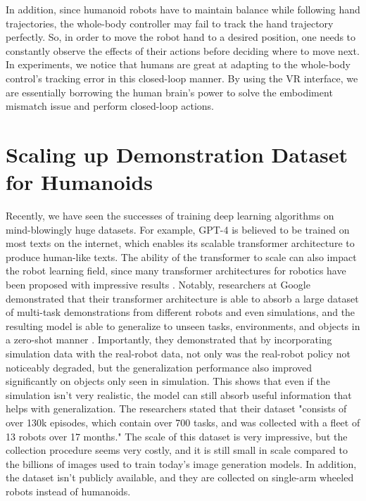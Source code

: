 In addition, since humanoid robots have to maintain balance while following hand trajectories, the whole-body controller may fail to track the hand trajectory perfectly. So, in order to move the robot hand to a desired position, one needs to constantly observe the effects of their actions before deciding where to move next. In experiments, we notice that humans are great at adapting to the whole-body control's tracking error in this closed-loop manner. By using the VR interface, we are essentially borrowing the human brain's power to solve the embodiment mismatch issue and perform closed-loop actions. 

\section{Scaling up Demonstration Dataset for Humanoids}

Recently, we have seen the successes of training deep learning algorithms on mind-blowingly huge datasets. For example, GPT-4 \cite{openai2023gpt4} is believed to be trained on most texts on the internet, which enables its scalable transformer architecture to produce human-like texts. The ability of the transformer to scale can also impact the robot learning field, since many transformer architectures for robotics have been proposed with impressive results \cite{zhu2023viola} \cite{jiang2022vima}. Notably, researchers at Google demonstrated that their transformer architecture is able to absorb a large dataset of multi-task demonstrations from different robots and even simulations, and the resulting model is able to generalize to unseen tasks, environments, and objects in a zero-shot manner \cite{brohan2022rt1}. Importantly, they demonstrated that by incorporating simulation data with the real-robot data, not only was the real-robot policy not noticeably degraded, but the generalization performance also improved significantly on objects only seen in simulation. This shows that even if the simulation isn't very realistic, the model can still absorb useful information that helps with generalization. The researchers stated that their dataset "consists of over 130k episodes, which contain over 700 tasks, and was collected with a fleet of 13 robots over 17 months." The scale of this dataset is very impressive, but the collection procedure seems very costly, and it is still small in scale compared to the billions of images used to train today's image generation models. In addition, the dataset isn't publicly available, and they are collected on single-arm wheeled robots instead of humanoids. 

